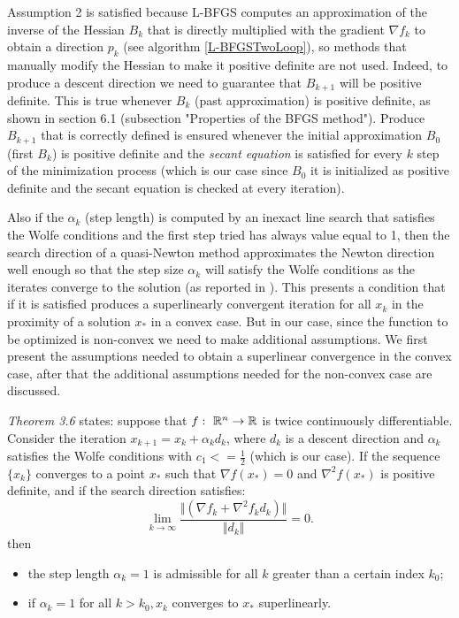 Assumption 2 is satisfied because L-BFGS computes an approximation of the inverse of the Hessian $B_{k}$ that is directly multiplied with the gradient $\nabla f_{k}$ to obtain a direction $p_{k}$ (see algorithm \ref{L-BFGSTwoLoop}), so methods that manually modify the Hessian to make it positive definite are not used. Indeed, to produce a descent direction we need to guarantee that $B_{k+1}$  will be positive definite. This is true whenever $B_{k}$ (past approximation) is positive definite, as shown in \cite{numerical} section 6.1 (subsection "Properties of the BFGS method"). Produce $B_{k+1}$ that is correctly defined is ensured whenever the initial approximation $B_{0}$ (first $B_{k}$) is positive definite and the \textit{secant equation} is satisfied for every $k$ step of the minimization process (which is our case since $B_{0}$ it is initialized as positive definite and the secant equation is checked at every iteration). 

Also if the $\alpha_{k}$ (step length) is computed by an inexact line search that satisfies the Wolfe conditions and the first step tried has always value equal to 1, then the search direction of a quasi-Newton method approximates the Newton direction well enough so that the step size $\alpha_{k}$ will satisfy the Wolfe conditions as the iterates converge to the solution (as reported in \cite{numerical}). This presents a condition that if it is satisfied produces a superlinearly convergent iteration for all $x_{k}$ in the proximity of a solution $x_{*}$ in a convex case. But in our case, since the function to be optimized is non-convex we need to make additional assumptions. We first present the assumptions needed to obtain a superlinear convergence in the convex case, after that the additional assumptions needed for the non-convex case are discussed.

\textit{Theorem 3.6} states: suppose that $f: \textnormal{ }\mathbb{R}^n \rightarrow \mathbb{R}$ is twice continuously differentiable. Consider the iteration $x_{k+1} = x_{k} + \alpha_{k}d_{k}$, where $d_{k}$ is a descent direction and $\alpha_{k}$ satisfies the Wolfe conditions with $c_{1} <= \frac{1}{2}$ (which is our case). If the sequence $\{ x_{k} \}$ converges to a point $x_{*}$ such that $\nabla f(x_{*}) = 0$ and $\nabla^2f(x_{*})$ is positive definite, and if the search direction satisfies: 
\begin{equation}
\label{FirstConditionAlpha}
 \lim_{k\to\infty}\frac{\Vert (\nabla f_{k} + \nabla^2 f_{k} d_{k})\Vert}{\Vert d_{k} \Vert} = 0.
\end{equation} 
then 
\begin{itemize}
	\item the step length $\alpha_{k} = 1$ is admissible for all $k$ greater than a certain index $k_{0}$;
	\item if $\alpha_{k} = 1$ for all $k>k_{0}, x_{k}$ converges to $x_{*}$ superlinearly.
\end{itemize}

